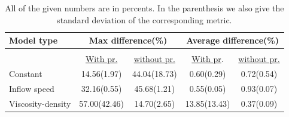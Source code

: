 \documentclass{llncs}
\begin{document}
\begin{table}
  \begin{center}
    \begin{tabular}{lcc|cc}
      \textbf{Model type} & \multicolumn{2}{c|}{\textbf{Max difference(\%) }}  &  \multicolumn{2}{c}{\textbf{Average difference(\%)}}\\
      \hline 
      \multicolumn{3}{c|}{}&&\\
                 & \underline{With pr.} & \underline{without pr.}  &  \underline{With pr}.& \underline{without pr.}\\
      
      Constant           &14.56(1.97)&44.04(18.73)&0.60(0.29)&0.72(0.54)  \\
      Inflow speed       &32.16(0.55)&45.68(1.21)&0.55(0.05)&0.93(0.07)   \\
      Viscosity-density  &57.00(42.46)&14.70(2.65)&13.85(13.43)&0.37(0.09)\\
    \end{tabular}
  \end{center}
  \caption{All of the given numbers are in percents. In the parenthesis we also give the standard deviation of the corresponding metric.}\label{tab:single}
\end{table}
\end{document}
